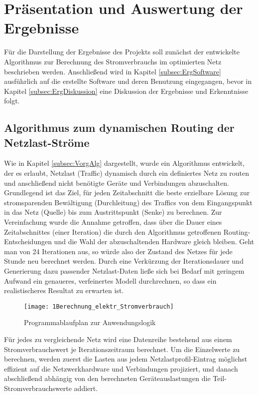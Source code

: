 
\section{Präsentation und Auswertung der Ergebnisse} \label{sec:Erg}
Für die Darstellung der Ergebnisse des Projekts soll zunächst der entwickelte Algorithmus zur Berechnung des Stromverbrauchs im optimierten Netz beschrieben werden. Anschließend wird in Kapitel \ref{subsec:ErgSoftware} ausführlich auf die erstellte Software  und deren Benutzung eingegangen, bevor in Kapitel \ref{subsec:ErgDiskussion} eine Diskussion der Ergebnisse und Erkenntnisse folgt.

\subsection{Algorithmus zum dynamischen Routing der Netzlast-Ströme} \label{subsec:ErgAlg}
Wie in Kapitel \ref{subsec:VorgAlg} dargestellt, wurde ein Algorithmus entwickelt, der es erlaubt, Netzlast (Traffic) dynamisch durch ein definiertes Netz zu routen und anschließend nicht benötigte Geräte und Verbindungen abzuschalten.
Grundlegend ist das Ziel, für jeden Zeitabschnitt die beste erzielbare Lösung zur stromsparenden Bewältigung (Durchleitung) des Traffics von dem Eingangspunkt in das Netz (Quelle) bis zum Austrittspunkt (Senke) zu berechnen. Zur Vereinfachung wurde die Annahme getroffen, dass über die Dauer eines Zeitabschnittes (einer Iteration) die durch den Algorithmus getroffenen Routing-Entscheidungen und die Wahl der abzuschaltenden Hardware gleich bleiben. Geht man von 24 Iterationen aus, so würde also der Zustand des Netzes für jede Stunde neu berechnet werden. Durch eine Verkürzung der Iterationsdauer und Generierung dazu passender Netzlast-Daten ließe sich bei Bedarf mit geringem Aufwand ein genaueres, verfeinertes Modell durchrechnen, so dass ein realistischeres Resultat zu erwarten ist.


\begin{figure}[htbp]
	\centering
	\texttt{[image: 1Berechnung\_elektr\_Stromverbrauch]}
	\caption{Programmablaufplan zur Anwendungslogik}
	\label{fig:1Berechnung_elektr_Stromverbrauch}
\end{figure}


Für jedes zu vergleichende Netz wird eine Datenreihe bestehend aus einem Stromverbrauchswert je Iterationszeitraum berechnet. Um die Einzelwerte zu berechnen, werden zuerst die Lasten aus jedem Netzlastprofil-Eintrag möglichst effizient auf die Netzwerkhardware und Verbindungen projiziert, und danach abschließend abhängig von den berechneten Geräteauslastungen die Teil-Stromverbrauchswerte addiert.


